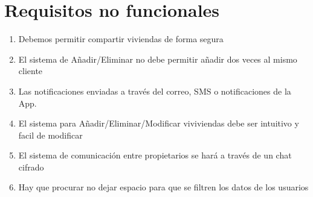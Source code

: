 \section{Requisitos no funcionales}
\begin{enumerate}
\item Debemos permitir compartir viviendas de forma segura 
\item El sistema de Añadir/Eliminar no debe permitir añadir dos veces al mismo cliente
\item Las notificaciones enviadas a través del correo, SMS o notificaciones de la App.
\item El sistema para Añadir/Eliminar/Modificar viviviendas debe ser intuitivo y facil de modificar
\item El sistema de comunicación entre propietarios se hará a través de un chat cifrado
\item Hay que procurar no dejar espacio para que se filtren los datos de los usuarios
\end{enumerate}
